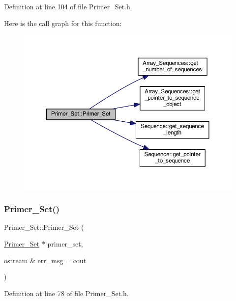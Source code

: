 Definition at line 104 of file Primer\+\_\+\+Set.\+h.

Here is the call graph for this function\+:
\nopagebreak
\begin{figure}[H]
\begin{center}
\leavevmode
\includegraphics[width=350pt]{class_primer___set_ae81dafc2ac39deb5480f68dac440e88e_cgraph}
\end{center}
\end{figure}
\mbox{\label{class_primer___set_a47c64ebda73f5a9d34d68f3c116c09cf}} 
\subsubsection{\texorpdfstring{Primer\+\_\+\+Set()}{Primer\_Set()}\hspace{0.1cm}{\footnotesize\ttfamily [3/5]}}
{\footnotesize\ttfamily Primer\+\_\+\+Set\+::\+Primer\+\_\+\+Set (\begin{DoxyParamCaption}\item[{\mbox{\hyperlink{class_primer___set}{Primer\+\_\+\+Set}} $\ast$}]{primer\+\_\+set,  }\item[{ostream \&}]{err\+\_\+msg = {\ttfamily cout} }\end{DoxyParamCaption})}



Definition at line 78 of file Primer\+\_\+\+Set.\+h.

